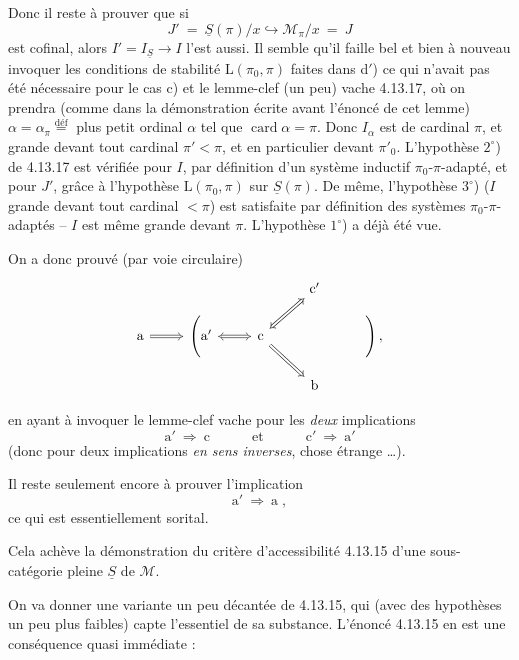 \documentclass[11pt]{article}
\newcommand{\msp}[1]{\marginpar{\footnotesize [#1]}}
\DeclareMathOperator{\card}{card}
\begin{document}
Donc il reste à prouver que si
\[
J' \ = \ \underline{S}(\pi)/x \hookrightarrow \mathcal{M}_\pi/x \ = \ J
\]
est cofinal, alors $I' = I_{\underline{S}} \longrightarrow I$ l'est aussi. Il semble qu'il faille bel et bien à nouveau invoquer les conditions de stabilité $\mathrm{L}(\pi_0,\pi)$ faites dans d$'$) ce qui n'avait pas été nécessaire pour le cas c) et
\msp{page 336}
le lemme-clef (un peu) vache 4.13.17, où on prendra (comme dans la démonstration écrite
avant l'énoncé de cet lemme) %
$\alpha = \alpha_\pi \overset{\text{déf}}{=}$ plus petit ordinal $\alpha$ tel que $\card\alpha = \pi$. Donc $I_\alpha$ est de cardinal $\pi$, et grande devant tout cardinal $\pi' < \pi$, et en particulier devant $\pi'_0$. L'hypothèse $2^\circ$) de 4.13.17 est vérifiée pour $I$, par définition d'un système inductif $\pi_0$-$\pi$-adapté, et pour $J'$, grâce à l'hypothèse $\mathrm{L}(\pi_0,\pi)$ sur $\underline{S}(\pi)$. De même, l'hypothèse $3^\circ$) ($I$ grande devant tout cardinal $< \pi$) est satisfaite par définition des systèmes $\pi_0$-$\pi$-adaptés -- $I$ est même grande devant $\pi$. L'hypothèse $1^\circ$) a déjà été vue.

On a donc prouvé (par voie circulaire)
\[
\begin{tikzcd}[row sep=small]
& & & \mathrm{c}' & \\
\mathrm{a} \arrow[r, Rightarrow] & \Bigg(\mathrm{a}' \arrow[r, Leftrightarrow] & \mathrm{c} \arrow[ur, Leftrightarrow] \arrow[dr, Rightarrow] & & \Bigg)\, , \\ %
& & & \mathrm{b} &
\end{tikzcd}
\]

 en ayant à invoquer le lemme-clef vache pour les \textit{deux} implications
\[
\mathrm{a}' \ \Longrightarrow \ \mathrm{c} \qquad\quad \text{et} \qquad\quad \mathrm{c}' \ \Longrightarrow \ \mathrm{a}'
\]
(donc pour deux implications \textit{en sens inverses}, chose étrange \dots).

\msp{page 337}

Il reste seulement encore à prouver l'implication
\[
\mathrm{a}' \ \Longrightarrow \ \mathrm{a} \; ,
\]
ce qui est essentiellement sorital.

Cela achève la démonstration du critère d'accessibilité 4.13.15 d'une sous-catégorie pleine $\underline{S}$ de $\mathcal{M}$.

On va donner une variante un peu décantée de 4.13.15, qui (avec des hypothèses un peu plus faibles) capte l'essentiel de sa substance. L'énoncé 4.13.15 en est une conséquence quasi immédiate :
\end{document}
